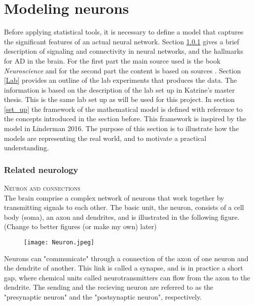
\chapter{Modeling neurons}

Before applying statistical tools, it is necessary to define a model that captures the significant features of an actual neural network. Section \ref{structure_nn} gives a brief description of signaling and connectivity in neural networks, and the hallmarks for AD in the brain. For the first part the main source used is the book \textit{Neuroscience} \cite{Purves} and for the second part the content is based on sources \cite{Gomez,Witter:2011}. Section \ref{Lab} provides an outline of the lab experiments that produces the data. The information is based on the description of the lab set up in Katrine's master thesis. This is the same lab set up as will be used for this project. In section \ref{set_up} the  framework of the mathematical model is defined with reference to the concepts introduced in the section before. This framework is inspired by the model in Linderman 2016. The purpose of this section is to illustrate how the models are representing the real world, and to motivate a practical understanding. 



\subsection{Related neurology}
\label{structure_nn}

\textsc{Neuron and connections}\\
The brain comprise a complex network of neurons that work together by transmitting signals to each other. The basic unit, the neuron, 
 consists of a cell body (soma), an axon and dendrites, and is illustrated in the following figure.  (Change to better figures (or make my own) later)
\begin{figure}[h]
    \centering
    \texttt{[image: Neuron.jpeg]}
\end{figure} 

Neurons can "communicate" through a connection of the axon of one neuron and the dendrite of another. This link is called a synapse, and is in practice a short gap, where chemical units called neurotransmitters can flow from the axon to the dendrite. The sending and the recieving neuron are referred to as the "presynaptic neuron" and the "postsynaptic neuron", respectively. 

